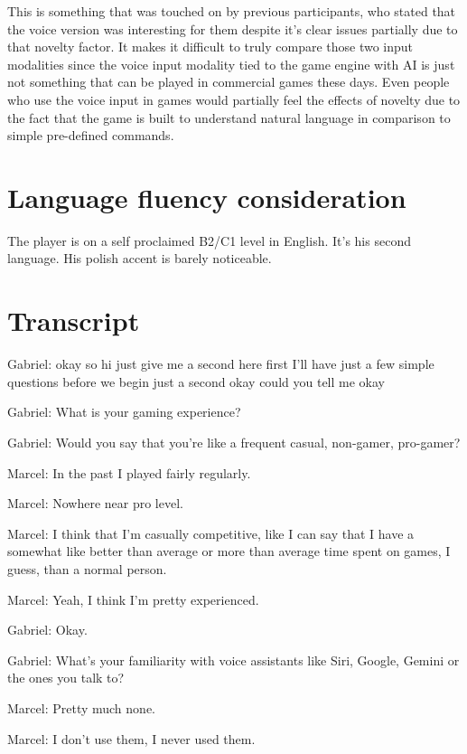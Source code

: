 This is something that was touched on by previous participants, who stated that the voice version was interesting for them despite it's clear issues partially due to that novelty factor. 
It makes it difficult to truly compare those two input modalities since the voice input modality tied to the game engine with AI is just not something that can be played in commercial games these days. Even people who use the voice input in games would partially feel the effects of novelty due to the fact that the game is built to understand natural language in comparison to simple pre-defined commands. 




\section{Language fluency consideration}


The player is on a self proclaimed B2/C1 level in English. It's his second language. His polish accent is barely noticeable.
\section{Transcript}
Gabriel: okay so hi just give me a second here first I'll have just a few simple questions before we begin just a second okay could you tell me okay

Gabriel: What is your gaming experience?

Gabriel: Would you say that you're like a frequent casual, non-gamer, pro-gamer?

Marcel: In the past I played fairly regularly.

Marcel: Nowhere near pro level.

Marcel: I think that I'm casually competitive, like I can say that I have a somewhat like better than average or more than average time spent on games, I guess, than a normal person.

Marcel: Yeah, I think I'm pretty experienced.

Gabriel: Okay.

Gabriel: What's your familiarity with voice assistants like Siri, Google, Gemini or the ones you talk to?

Marcel: Pretty much none.

Marcel: I don't use them, I never used them.

